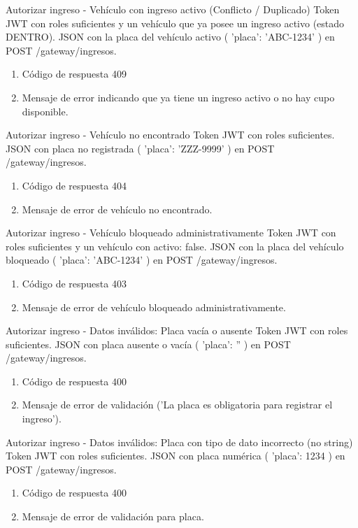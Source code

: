 {Autorizar ingreso - Vehículo con ingreso activo (Conflicto / Duplicado)}
{Token JWT con roles suficientes y un vehículo que ya posee un ingreso activo (estado DENTRO).}
{JSON con la placa del vehículo activo ({ 'placa': 'ABC-1234' }) en POST /gateway/ingresos.}
{\begin{enumerate} [leftmargin=*, nosep]
    \item Código de respuesta 409
    \item Mensaje de error indicando que ya tiene un ingreso activo o no hay cupo disponible.
\end{enumerate}}

{Autorizar ingreso - Vehículo no encontrado}
{Token JWT con roles suficientes.}
{JSON con placa no registrada ({ 'placa': 'ZZZ-9999' }) en POST /gateway/ingresos.}
{\begin{enumerate} [leftmargin=*, nosep]
    \item Código de respuesta 404
    \item Mensaje de error de vehículo no encontrado.
\end{enumerate}}

{Autorizar ingreso - Vehículo bloqueado administrativamente}
{Token JWT con roles suficientes y un vehículo con activo: false.}
{JSON con la placa del vehículo bloqueado ({ 'placa': 'ABC-1234' }) en POST /gateway/ingresos.}
{\begin{enumerate} [leftmargin=*, nosep]
    \item Código de respuesta 403
    \item Mensaje de error de vehículo bloqueado administrativamente.
\end{enumerate}}

{Autorizar ingreso - Datos inválidos: Placa vacía o ausente}
{Token JWT con roles suficientes.}
{JSON con placa ausente o vacía ({ 'placa': '' }) en POST /gateway/ingresos.}
{\begin{enumerate} [leftmargin=*, nosep]
    \item Código de respuesta 400
    \item Mensaje de error de validación ('La placa es obligatoria para registrar el ingreso').
\end{enumerate}}

{Autorizar ingreso - Datos inválidos: Placa con tipo de dato incorrecto (no string)}
{Token JWT con roles suficientes.}
{JSON con placa numérica ({ 'placa': 1234 }) en POST /gateway/ingresos.}
{\begin{enumerate} [leftmargin=*, nosep]
    \item Código de respuesta 400
    \item Mensaje de error de validación para placa.
\end{enumerate}}

